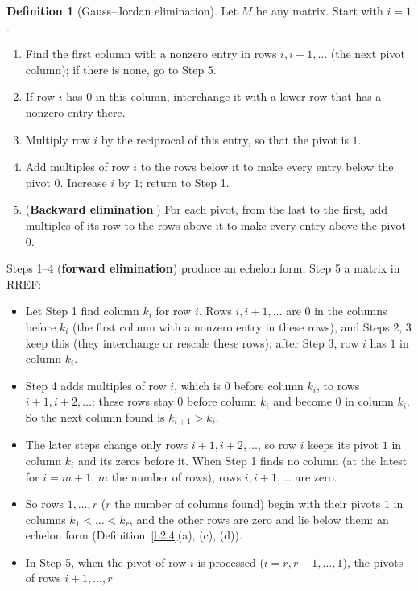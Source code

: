 \documentclass[12pt]{article}
\theoremstyle{definition}
\newtheorem{definition}[theorem]{Definition}
\begin{document}
\begin{definition}[Gauss--Jordan elimination]\label{b2.5}
Let \(M\) be any matrix. Start with \(i=1\).
\begin{enumerate}[label=\textit{Step \arabic*.},leftmargin=*,itemsep=0pt]
\item Find the first column with a nonzero entry in rows \(i,i+1,\dots\) (the next pivot column); if there is none,
go to Step 5.
\item If row \(i\) has \(0\) in this column, interchange it with a lower row that has a nonzero entry there.
\item Multiply row \(i\) by the reciprocal of this entry, so that the pivot is \(1\).
\item Add multiples of row \(i\) to the rows below it to make every entry below the pivot \(0\). Increase \(i\) by
\(1\); return to Step 1.
\item (\textbf{Backward elimination}.) For each pivot, from the last to the first, add multiples of its row to the
rows above it to make every entry above the pivot \(0\).
\end{enumerate}
Steps 1--4 (\textbf{forward elimination}) produce an echelon form, Step 5 a matrix in RREF:
\begin{itemize}
\item Let Step 1 find column \(k_i\) for row \(i\). Rows \(i,i+1,\dots\) are \(0\) in the columns before \(k_i\) (the
first column with a nonzero entry in these rows), and Steps 2, 3 keep this (they interchange or rescale these rows);
after Step 3, row \(i\) has \(1\) in column \(k_i\).
\item Step 4 adds multiples of row \(i\), which is \(0\) before column \(k_i\), to rows \(i+1,i+2,\dots\): these rows
stay \(0\) before column \(k_i\) and become \(0\) in column \(k_i\). So the next column found is \(k_{i+1}>k_i\).
\item The later steps change only rows \(i+1,i+2,\dots\), so row \(i\) keeps its pivot \(1\) in column \(k_i\) and its
zeros before it. When Step 1 finds no column (at the latest for \(i=m+1\), \(m\) the number of rows), rows
\(i,i+1,\dots\) are zero.
\item So rows \(1,\dots,r\) (\(r\) the number of columns found) begin with their pivots \(1\) in columns
\(k_1<\dots<k_r\), and the other rows are zero and lie below them: an echelon form (Definition~\ref{b2.4}(a), (c),
(d)).
\item In Step 5, when the pivot of row \(i\) is processed (\(i=r,r-1,\dots,1\)), the pivots of rows \(i+1,\dots,r\)

\end{itemize}
\end{definition}
\end{document}

